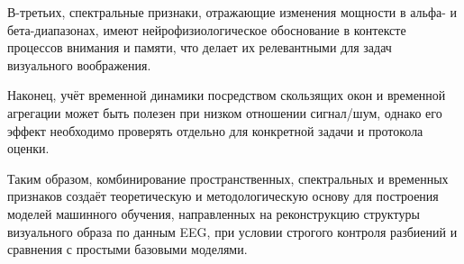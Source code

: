 В-третьих, спектральные признаки, отражающие изменения мощности в альфа- и бета-диапазонах, имеют нейрофизиологическое обоснование в контексте процессов внимания и памяти, что делает их релевантными для задач визуального воображения.

Наконец, учёт временной динамики посредством скользящих окон и временной агрегации может быть полезен при низком отношении сигнал/шум, однако его эффект необходимо проверять отдельно для конкретной задачи и протокола оценки.

Таким образом, комбинирование пространственных, спектральных и временных признаков создаёт теоретическую и методологическую основу для построения моделей машинного обучения, направленных на реконструкцию структуры визуального образа по данным EEG, при условии строгого контроля разбиений и сравнения с простыми базовыми моделями.

